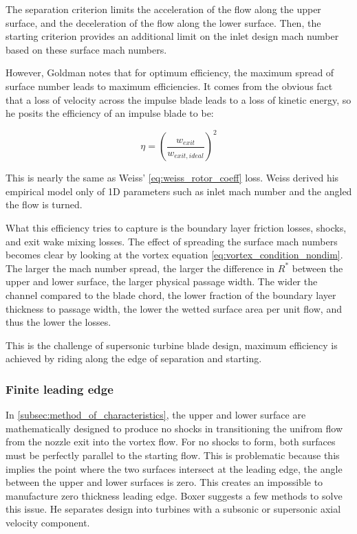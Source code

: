 The separation criterion limits the acceleration of the flow along the upper surface, and the deceleration of the flow along the lower surface. Then, the starting criterion provides an additional limit on the inlet design mach number based on these surface mach numbers. 

However, Goldman notes that for optimum efficiency, the maximum spread of surface number leads to maximum efficiencies. It comes from the obvious fact that a loss of velocity across the impulse blade leads to a loss of kinetic energy, so he posits the efficiency of an impulse blade to be:

\begin{equation}
    \eta = \left(\frac{w_{exit}}{w_{exit,ideal}}\right)^2
\end{equation}



This is nearly the same as Weiss' \cref{eq:weiss_rotor_coeff} loss. Weiss derived his empirical model only of 1D parameters such as inlet mach number and the angled the flow is turned. 

What this efficiency tries to capture is the boundary layer friction losses, shocks, and exit wake mixing losses. The effect of spreading the surface mach numbers becomes clear by looking at the vortex equation \cref{eq:vortex_condition_nondim}. The larger the mach number spread, the larger the difference in $R^*$ between the upper and lower surface, the larger physical passage width. The wider the channel compared to the blade chord, the lower fraction of the boundary layer thickness to passage width, the lower the wetted surface area per unit flow, and thus the lower the losses.

This is the challenge of supersonic turbine blade design, maximum efficiency is achieved by riding along the edge of separation and starting.

\subsubsection{Finite leading edge}

In \cref{subsec:method_of_characteristics}, the upper and lower surface are mathematically designed to produce no shocks in transitioning the unifrom flow from the nozzle exit into the vortex flow. For no shocks to form, both surfaces must be perfectly parallel to the starting flow. This is problematic because this implies the point where the two surfaces intersect at the leading edge, the angle between the upper and lower surfaces is zero. This creates an impossible to manufacture zero thickness leading edge. Boxer suggests a few methods to solve this issue. He separates design into turbines with a subsonic or supersonic axial velocity component. 

